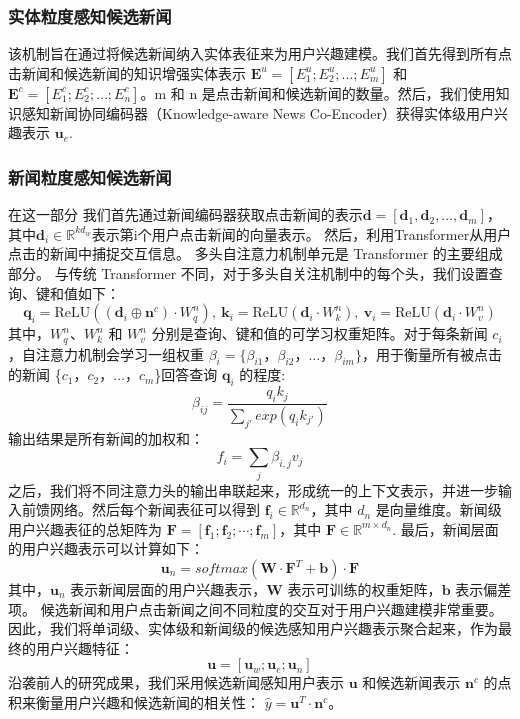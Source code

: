 \documentclass[withoutpreface,bwprint]{cumcmthesis} %
\begin{document}
	\subsubsection{ 实体粒度感知候选新闻}
	该机制旨在通过将候选新闻纳入实体表征来为用户兴趣建模。我们首先得到所有点击新闻和候选新闻的知识增强实体表示 $\mathbf{E}^{u} = [E^u_1;E^u_2;\dots;E^u_m] $ 和 $\mathbf{E}^{c} = [E^c_1;E^c_2;\dots;E^c_n] $。m 和 n 是点击新闻和候选新闻的数量。然后，我们使用知识感知新闻协同编码器（Knowledge-aware News Co-Encoder）获得实体级用户兴趣表示 $\mathbf{u}_e $.
	\subsubsection{ 新闻粒度感知候选新闻}
	在这一部分 
	我们首先通过新闻编码器获取点击新闻的表示$\mathbf{d}=[\mathbf{d}_1, \mathbf{d}_2,\dots,\mathbf{d}_m]$，其中$\mathbf{d}_i \in \mathbb{R}^{kd_w}$表示第i个用户点击新闻的向量表示。
	然后，利用Transformer从用户点击的新闻中捕捉交互信息。
	多头自注意力机制单元是 Transformer 的主要组成部分。
	与传统 Transformer 不同，对于多头自关注机制中的每个头，我们设置查询、键和值如下：
	\begin{equation}\label{eatt}
	\mathbf{q}_{i} = \mathrm{ReLU}((\mathbf{d}_i \oplus \mathbf{n}^c) \cdot W^n_q),~ \mathbf{k}_{i} = \mathrm{ReLU}(\mathbf{d}_i \cdot W^n_k),~
	\mathbf{v}_{i} = \mathrm{ReLU}(\mathbf{d}_i \cdot W^n_v)
	\end{equation}
	其中，$W^n_q$、$W^n_k$ 和 $W^n_v$ 分别是查询、键和值的可学习权重矩阵。对于每条新闻 $c_i$，自注意力机制会学习一组权重 $\beta_i = \{\beta_{i1}，\beta_{i2}，\dots，\beta_{im}\}$，用于衡量所有被点击的新闻 \{$c_1$，$c_2$，$\dots$，$c_m$\}回答查询 $\mathbf{q}_i$ 的程度:
	\begin{equation}
	\beta_{ij} = \frac{q_ik_j}{\sum_{j'}exp(q_ik_{j'})}
	\end{equation}
	输出结果是所有新闻的加权和：
	\begin{equation}
	f_i = \sum_j \beta_{i,j}v_j
	\end{equation}
	之后，我们将不同注意力头的输出串联起来，形成统一的上下文表示，并进一步输入前馈网络。然后每个新闻表征可以得到 $\mathbf{f}_i \in \mathbb{R}^{d_n}$，其中 $d_n$ 是向量维度。新闻级用户兴趣表征的总矩阵为 $\mathbf{F}=[\mathbf{f}_1; \mathbf{f}_2; \cdots; \mathbf{f}_m]$，其中 $\mathbf{F} \in \mathbb{R}^{m \times d_n}$.
	最后，新闻层面的用户兴趣表示可以计算如下：
	\begin{equation}
	\mathbf{u}_n = softmax( \mathbf{W} \cdot \mathbf{F}^{T} + \mathbf{b}) \cdot \mathbf{F}
	\end{equation}
	其中，$\mathbf{u}_n$ 表示新闻层面的用户兴趣表示，$\mathbf{W}$ 表示可训练的权重矩阵，$\mathbf{b}$ 表示偏差项。
	候选新闻和用户点击新闻之间不同粒度的交互对于用户兴趣建模非常重要。因此，我们将单词级、实体级和新闻级的候选感知用户兴趣表示聚合起来，作为最终的用户兴趣特征：
	\begin{equation}
	\mathbf{u} = [\mathbf{u}_w; \mathbf{u}_e; \mathbf{u}_n]
	\end{equation}
	沿袭前人的研究成果，我们采用候选新闻感知用户表示 $\mathbf{u}$ 和候选新闻表示 $\mathbf{n}^c$ 的点积来衡量用户兴趣和候选新闻的相关性： $\hat{y} = \mathbf{u}^T \cdot \mathbf{n}^c$。
\end{document}

